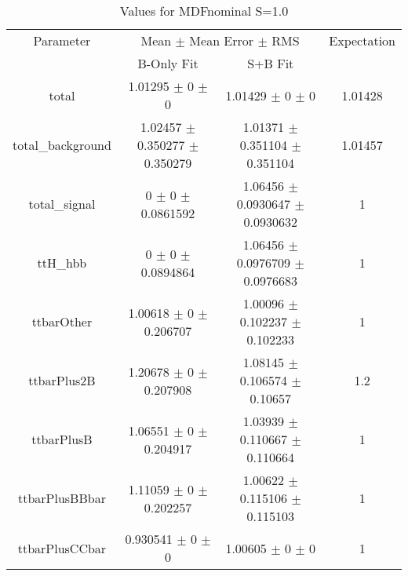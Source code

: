 \begin{table}
\centering
\caption{Values for MDFnominal S=1.0}
\begin{tabular}{cccc}
\toprule
Parameter & \multicolumn{2}{c}{Mean $\pm$ Mean Error $\pm$ RMS} & Expectation\\
 & B-Only Fit & S+B Fit & \\
\midrule
total & \num{1.01295} $\pm$ \num{0} $\pm$ \num{0} & \num{1.01429} $\pm$ \num{0} $\pm$ \num{0} & \num{1.01428}\\
total\_background & \num{1.02457} $\pm$ \num{0.350277} $\pm$ \num{0.350279} & \num{1.01371} $\pm$ \num{0.351104} $\pm$ \num{0.351104} & \num{1.01457}\\
total\_signal & \num{0} $\pm$ \num{0} $\pm$ \num{0.0861592} & \num{1.06456} $\pm$ \num{0.0930647} $\pm$ \num{0.0930632} & \num{1}\\
ttH\_hbb & \num{0} $\pm$ \num{0} $\pm$ \num{0.0894864} & \num{1.06456} $\pm$ \num{0.0976709} $\pm$ \num{0.0976683} & \num{1}\\
ttbarOther & \num{1.00618} $\pm$ \num{0} $\pm$ \num{0.206707} & \num{1.00096} $\pm$ \num{0.102237} $\pm$ \num{0.102233} & \num{1}\\
ttbarPlus2B & \num{1.20678} $\pm$ \num{0} $\pm$ \num{0.207908} & \num{1.08145} $\pm$ \num{0.106574} $\pm$ \num{0.10657} & \num{1.2}\\
ttbarPlusB & \num{1.06551} $\pm$ \num{0} $\pm$ \num{0.204917} & \num{1.03939} $\pm$ \num{0.110667} $\pm$ \num{0.110664} & \num{1}\\
ttbarPlusBBbar & \num{1.11059} $\pm$ \num{0} $\pm$ \num{0.202257} & \num{1.00622} $\pm$ \num{0.115106} $\pm$ \num{0.115103} & \num{1}\\
ttbarPlusCCbar & \num{0.930541} $\pm$ \num{0} $\pm$ \num{0} & \num{1.00605} $\pm$ \num{0} $\pm$ \num{0} & \num{1}\\
\bottomrule
\end{tabular}
\end{table}